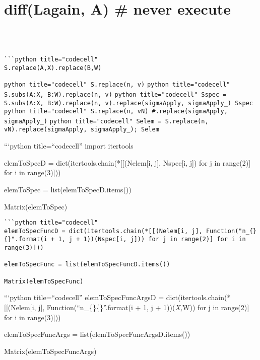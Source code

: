 \documentclass[
]{article}
\begin{document}
\hypertarget{difflagain-a-never-execute}{%
\section{diff(Lagain, A) \# never
execute}\label{difflagain-a-never-execute}}

\hypertarget{section}{%
\section{}\label{section}}

\begin{verbatim}


```python title="codecell"
S.replace(A,X).replace(B,W)
\end{verbatim}

\texttt{python title="codecell" S.replace(n, v)}
\texttt{python title="codecell" S.subs({A:X, B:W}).replace(n, v)}
\texttt{python title="codecell" Sspec = S.subs({A:X, B:W}).replace(n, v).replace(sigmaApply, sigmaApply_) Sspec}
\texttt{python title="codecell" S.replace(n, vN) #.replace(sigmaApply, sigmaApply_)}
\texttt{python title="codecell" Selem = S.replace(n, vN).replace(sigmaApply, sigmaApply_); Selem}

```python title=``codecell'' import itertools

elemToSpecD = dict(itertools.chain(*{[}{[}(Nelem{[}i, j{]}, Nspec{[}i,
j{]}) for j in range(2){]} for i in range(3){]}))

elemToSpec = list(elemToSpecD.items())

Matrix(elemToSpec)

\begin{verbatim}
```python title="codecell"
elemToSpecFuncD = dict(itertools.chain(*[[(Nelem[i, j], Function("n_{}{}".format(i + 1, j + 1))(Nspec[i, j])) for j in range(2)] for i in range(3)]))

elemToSpecFunc = list(elemToSpecFuncD.items())

Matrix(elemToSpecFunc)
\end{verbatim}

```python title=``codecell'' elemToSpecFuncArgsD =
dict(itertools.chain(*{[}{[}(Nelem{[}i, j{]},
Function(``n\_\{\}\{\}''.format(i + 1, j + 1))(\emph{X,}W)) for j in
range(2){]} for i in range(3){]}))

elemToSpecFuncArgs = list(elemToSpecFuncArgsD.items())

Matrix(elemToSpecFuncArgs)
\end{document}
